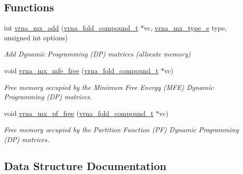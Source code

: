 \subsection*{Functions}
\begin{DoxyCompactItemize}
\item 
int \hyperlink{group__dp__matrices_ga08661f098008961dab0023bf300f0c33}{vrna\+\_\+mx\+\_\+add} (\hyperlink{group__fold__compound_ga1b0cef17fd40466cef5968eaeeff6166}{vrna\+\_\+fold\+\_\+compound\+\_\+t} $\ast$vc, \hyperlink{group__dp__matrices_ga6042ea1d58d01931e959791be6d89343}{vrna\+\_\+mx\+\_\+type\+\_\+e} type, unsigned int options)
\begin{DoxyCompactList}\small\item\em Add Dynamic Programming (DP) matrices (allocate memory) \end{DoxyCompactList}\item 
void \hyperlink{group__dp__matrices_ga6a9422feb5dfe5c64050cebf447672d0}{vrna\+\_\+mx\+\_\+mfe\+\_\+free} (\hyperlink{group__fold__compound_ga1b0cef17fd40466cef5968eaeeff6166}{vrna\+\_\+fold\+\_\+compound\+\_\+t} $\ast$vc)
\begin{DoxyCompactList}\small\item\em Free memory occupied by the Minimum Free Energy (M\+FE) Dynamic Programming (DP) matrices. \end{DoxyCompactList}\item 
void \hyperlink{group__dp__matrices_ga2283e69fd139fb8e58d7ade3b5773f9c}{vrna\+\_\+mx\+\_\+pf\+\_\+free} (\hyperlink{group__fold__compound_ga1b0cef17fd40466cef5968eaeeff6166}{vrna\+\_\+fold\+\_\+compound\+\_\+t} $\ast$vc)
\begin{DoxyCompactList}\small\item\em Free memory occupied by the Partition Function (PF) Dynamic Programming (DP) matrices. \end{DoxyCompactList}\end{DoxyCompactItemize}


\subsection{Data Structure Documentation}
\label{structvrna__mx__mfe__s}
